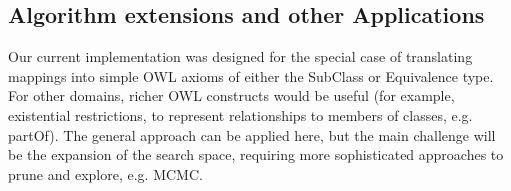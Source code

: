 \documentclass{my}
\begin{document}
\subsection{Algorithm extensions and other Applications}

Our current implementation was designed for the special case of
translating mappings into simple OWL axioms of either the SubClass or
Equivalence type. For other domains, richer OWL constructs would be
useful (for example, existential restrictions, to represent
relationships to members of classes, e.g. partOf). The general
approach can be applied here, but the main challenge will be the
expansion of the search space, requiring more sophisticated approaches
to prune and explore, e.g. MCMC.






\end{document}

